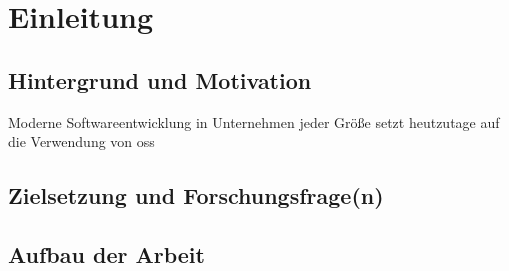 \chapter{Einleitung}


\section{Hintergrund und Motivation}

Moderne Softwareentwicklung in Unternehmen jeder Größe setzt heutzutage auf die Verwendung von \acrfull{oss}


\section{Zielsetzung und Forschungsfrage(n)}


\section{Aufbau der Arbeit}
